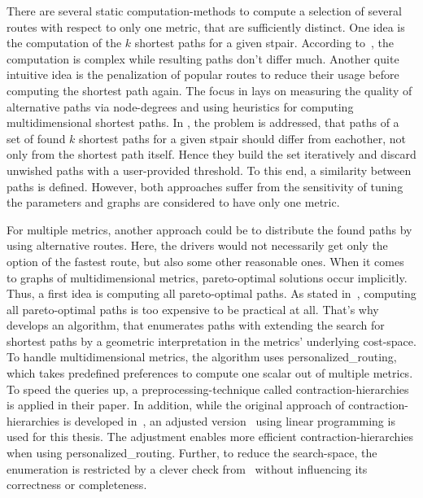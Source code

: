         There are several static computation-methods to compute a selection of several routes with respect to only one \gls{metric}, that are sufficiently distinct.
        One idea is the computation of the $k$ shortest paths for a given \gls{stpair}.
        According to~\cite{eppstein:finding_k_shortest_paths}, the computation is complex while resulting paths don't differ much.
        Another quite intuitive idea is the penalization of popular routes to reduce their usage before computing the shortest path again.
        The focus in \cite{bader:alternative-route-graphs} lays on measuring the quality of alternative paths via node-degrees and using heuristics for computing multidimensional shortest paths.
        In \cite{chondrogiannis:k_shortest_paths}, the problem is addressed, that paths of a set of found $k$ shortest paths for a given \gls{stpair} should differ from eachother, not only from the shortest path itself.
        Hence they build the set iteratively and discard unwished paths with a user-provided threshold.
        To this end, a similarity between paths is defined.
        However, both approaches suffer from the sensitivity of tuning the parameters and graphs are considered to have only one \gls{metric}.

        For multiple \glspl{metric}, another approach could be to distribute the found paths by using alternative routes.
        Here, the drivers would not necessarily get only the option of the fastest route, but also some other reasonable ones.
        When it comes to graphs of multidimensional \glspl{metric}, pareto-optimal solutions occur implicitly.
        Thus, a first idea is computing all pareto-optimal paths.
        As stated in~\cite{delling:pareto-paths}, computing all pareto-optimal paths is too expensive to be practical at all.
        That's why~\cite{barth:alternative_multicriteria_routes} develops an algorithm, that enumerates paths with extending the search for shortest paths by a geometric interpretation in the \glspl{metric}' underlying \gls{cost}-space.
        To handle multidimensional \glspl{metric}, the algorithm uses \gls{personalized_routing}, which takes predefined preferences to compute one scalar out of multiple \glspl{metric}.
        To speed the queries up, a preprocessing-technique called \gls{contraction-hierarchies} is applied in their paper.
        In addition, while the original approach of contraction-hierarchies is developed in~\cite{geisberger:contraction_hierarchies}, an adjusted version~\cite{funke:personal-routes} using linear programming is used for this thesis.
        The adjustment enables more efficient \gls{contraction-hierarchies} when using \gls{personalized_routing}.
        Further, to reduce the search-space, the enumeration is restricted by a clever check from~\cite{barth:alternative_routes} without influencing its correctness or completeness.

